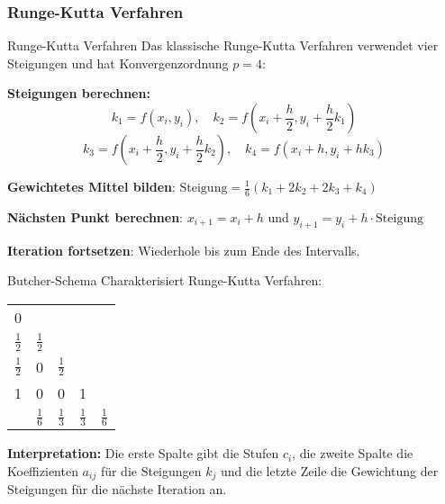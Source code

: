 \subsubsection{Runge-Kutta Verfahren}

\begin{KR}{Runge-Kutta Verfahren}
Das klassische Runge-Kutta Verfahren verwendet vier Steigungen und hat Konvergenzordnung $p = 4$:

\textbf{Steigungen berechnen:}
\vspace{-2mm}\\
$$k_1 = f(x_i, y_i), \quad
k_2 = f(x_i + \frac{h}{2}, y_i + \frac{h}{2} k_1)$$
$$k_3 = f(x_i + \frac{h}{2}, y_i + \frac{h}{2} k_2), \quad
k_4 = f(x_i + h, y_i + h k_3)$$

\textbf{Gewichtetes Mittel bilden}:
$\text{Steigung} = \frac{1}{6}(k_1 + 2k_2 + 2k_3 + k_4)$

\textbf{Nächsten Punkt berechnen}:
$x_{i+1} = x_i + h$ und $y_{i+1} = y_i + h \cdot \text{Steigung}$

\textbf{Iteration fortsetzen}:
Wiederhole bis zum Ende des Intervalls.
\end{KR}

\begin{concept}{Butcher-Schema}
    Charakterisiert Runge-Kutta Verfahren:

    \begin{minipage}{0.45\textwidth}
        \begin{center}
        \begin{tabular}{c|cccc}
        0 & & & & \\
        $\frac{1}{2}$ & $\frac{1}{2}$ & & & \\
        $\frac{1}{2}$ & 0 & $\frac{1}{2}$ & & \\
        1 & 0 & 0 & 1 & \\
        \hline
        & $\frac{1}{6}$ & $\frac{1}{3}$ & $\frac{1}{3}$ & $\frac{1}{6}$
        \end{tabular}
        \end{center}
    \end{minipage}
    \begin{minipage}{0.54\textwidth}
        \textbf{Interpretation:} Die erste Spalte gibt die Stufen $c_i$, 
        die zweite Spalte die Koeffizienten $a_{ij}$ für die Steigungen $k_j$ und die letzte Zeile die Gewichtung der Steigungen für die nächste Iteration an.
    \end{minipage}

\end{concept}


